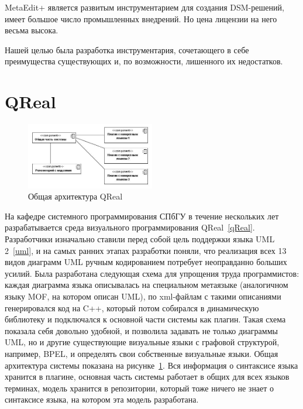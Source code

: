 \documentclass[a4paper]{article}
\begin{document}
MetaEdit+ является развитым инструментарием для создания DSM-решений, имеет большое число промышленных внедрений. Но цена лицензии на него весьма высока.

Нашей целью была разработка инструментария, сочетающего в себе преимущества существующих и, по возможности, лишенного их недостатков.

\section{QReal}

\begin{figure}
  \begin{center}
    \includegraphics[width=0.5\textwidth]{architecture.jpg}
    \caption{Общая архитектура QReal}
    \label{architecture}
  \end{center}
\end{figure}

На кафедре системного программирования СПбГУ в течение нескольких лет разрабатывается среда визуального программирования QReal~\ref{qReal}. Разработчики изначально ставили перед собой цель поддержки языка UML 2~\ref{uml}, и на самых ранних этапах разработки поняли, что реализация всех 13 видов диаграмм UML ручным кодированием потребует неоправданно больших усилий. Была разработана следующая схема для упрощения труда программистов: каждая диаграмма языка описывалась на специальном метаязыке (аналогичном языку MOF, на котором описан UML), по xml-файлам с такими описаниями генерировался код на C++, который потом собирался в динамическую библиотеку и подключался к основной части системы как плагин. Такая схема показала себя довольно удобной, и позволила задавать не только диаграммы UML, но и другие существующие визуальные языки с графовой структурой, например, BPEL, и определять свои собственные визуальные языки. Общая архитектура системы показана на рисунке~\ref{architecture}. Вся информация о синтаксисе языка хранится в плагине, основная часть системы работает в общих для всех языков терминах, модель хранится в репозитории, который тоже ничего не знает о синтаксисе языка, на котором эта модель разработана.
\end{document}
